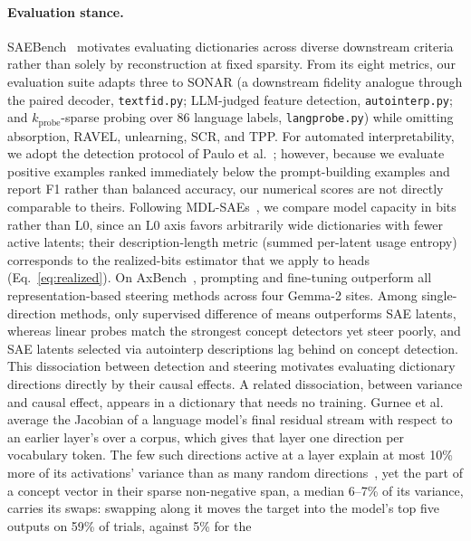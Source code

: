 \paragraph{Evaluation stance.}
SAEBench~\cite{karvonen2025} motivates evaluating dictionaries across
diverse downstream criteria rather than solely by reconstruction at fixed
sparsity. From its eight metrics, our evaluation suite adapts three to SONAR (a
downstream fidelity analogue through the paired decoder,
\texttt{textfid.py}; LLM-judged feature detection, \texttt{autointerp.py};
and $k_{\mathrm{probe}}$-sparse probing over 86 language labels,
\texttt{langprobe.py}) while omitting absorption, RAVEL, unlearning, SCR,
and TPP. For automated interpretability, we adopt
the detection protocol of Paulo et al.~\cite{paulo2025}; however, because
we evaluate positive examples ranked immediately below the prompt-building
examples and report F1 rather than balanced accuracy, our numerical
scores are not directly comparable to theirs. Following
MDL-SAEs~\cite{ayonrinde2024}, we compare model capacity in bits rather
than $\mathrm{L0}$, since an $\mathrm{L0}$ axis favors arbitrarily wide
dictionaries with fewer active latents; their description-length metric
(summed per-latent usage entropy) corresponds to the realized-bits
estimator that we apply to heads (Eq.~\eqref{eq:realized}). On
AxBench~\cite{wu2025axbenchsteeringllmssimple}, prompting and fine-tuning
outperform all representation-based steering methods across four Gemma-2
sites. Among single-direction methods, only supervised difference of
means outperforms SAE latents, whereas linear probes match the strongest
concept detectors yet steer poorly, and SAE latents selected via
autointerp descriptions lag behind on concept detection. This dissociation
between detection and steering motivates evaluating dictionary directions
directly by their causal effects. A related dissociation, between variance
and causal effect, appears in a dictionary that needs no training. Gurnee
et al.~\cite{gurnee2026verbalizable} average the Jacobian of a language
model's final residual stream with respect to an earlier layer's over a
corpus, which gives that layer one direction per vocabulary token. The few
such directions active at a layer explain at most 10\% more of its
activations' variance than as many random
directions~\cite[Sec.~4.2]{gurnee2026verbalizable}, yet the part of a
concept vector in their sparse non-negative span, a median 6--7\% of its
variance, carries its swaps: swapping along it moves the target into the
model's top five outputs on 59\% of trials, against 5\% for the
